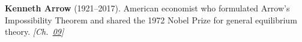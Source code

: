 \nobeleconomics \textbf{Kenneth Arrow} (1921–2017). American economist who formulated Arrow's Impossibility Theorem and shared the 1972 Nobel Prize for general equilibrium theory. \emph{[Ch.~\hyperref[ch:arrowtheoremtopology]{09}]}

